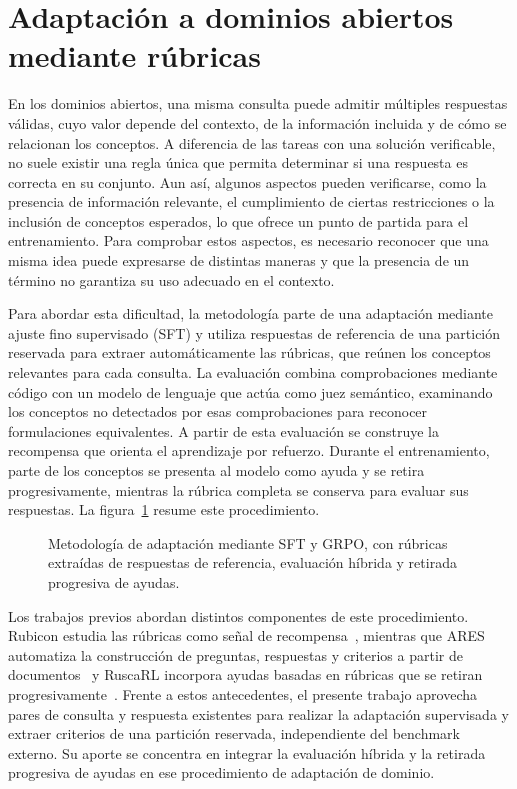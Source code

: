 \section{Adaptación a dominios abiertos mediante rúbricas}

En los dominios abiertos, una misma consulta puede admitir múltiples respuestas válidas, cuyo valor depende del contexto, de la información incluida y de cómo se relacionan los conceptos. A diferencia de las tareas con una solución verificable, no suele existir una regla única que permita determinar si una respuesta es correcta en su conjunto. Aun así, algunos aspectos pueden verificarse, como la presencia de información relevante, el cumplimiento de ciertas restricciones o la inclusión de conceptos esperados, lo que ofrece un punto de partida para el entrenamiento. Para comprobar estos aspectos, es necesario reconocer que una misma idea puede expresarse de distintas maneras y que la presencia de un término no garantiza su uso adecuado en el contexto.

Para abordar esta dificultad, la metodología parte de una adaptación mediante ajuste fino supervisado (SFT) y utiliza respuestas de referencia de una partición reservada para extraer automáticamente las rúbricas, que reúnen los conceptos relevantes para cada consulta. La evaluación combina comprobaciones mediante código con un modelo de lenguaje que actúa como juez semántico, examinando los conceptos no detectados por esas comprobaciones para reconocer formulaciones equivalentes. A partir de esta evaluación se construye la recompensa que orienta el aprendizaje por refuerzo. Durante el entrenamiento, parte de los conceptos se presenta al modelo como ayuda y se retira progresivamente, mientras la rúbrica completa se conserva para evaluar sus respuestas. La figura~\ref{fig:intro-pipeline} resume este procedimiento.

\begin{figure}[H]
\centering

\caption{Metodología de adaptación mediante SFT y GRPO, con rúbricas extraídas de respuestas de referencia, evaluación híbrida y retirada progresiva de ayudas.}
\label{fig:intro-pipeline}
\end{figure}

Los trabajos previos abordan distintos componentes de este procedimiento. Rubicon estudia las rúbricas como señal de recompensa~\cite{huang2025rubicon}, mientras que ARES automatiza la construcción de preguntas, respuestas y criterios a partir de documentos~\cite{li2026ares} y RuscaRL incorpora ayudas basadas en rúbricas que se retiran progresivamente~\cite{zhou2026ruscarl}. Frente a estos antecedentes, el presente trabajo aprovecha pares de consulta y respuesta existentes para realizar la adaptación supervisada y extraer criterios de una partición reservada, independiente del benchmark externo. Su aporte se concentra en integrar la evaluación híbrida y la retirada progresiva de ayudas en ese procedimiento de adaptación de dominio.

